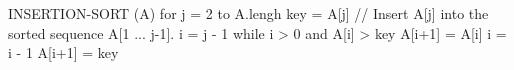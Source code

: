 INSERTION-SORT (A)
  for j = 2 to A.lengh
    key = A[j]
    // Insert A[j] into the sorted sequence A[1 ... j-1].
    i = j - 1
    while i > 0 and A[i] > key
      A[i+1] = A[i]
      i = i - 1
    A[i+1] = key
